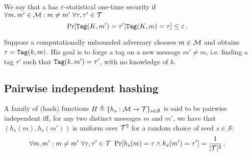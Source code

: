 \begin{definition}
	We say that a \Mac{} has $\varepsilon$-statistical one-time security if $\forall m, m' \in \mathcal{M} : m \neq m' \ \forall \tau, \tau' \in \mathcal{T}$
	\begin{equation}
		\Pr[\texttt{Tag}(K,m') = \tau' | \texttt{Tag}(K,m) = \tau] \leq \varepsilon \, .
	\end{equation}
\end{definition}

Suppose a computationally unbounded adversary chooses $m \in \mathcal{M}$ and obtains $\tau = \texttt{Tag}(k, m)$.
His goal is to forge a tag on a new message $m' \neq m$, i.e. finding a tag $\tau'$ such that $\texttt{Tag}(k,m') = \tau'$, with no knowledge of $k$.


\subsection{Pairwise independent hashing}
\begin{definition}
    A family of (hash) functions $H \triangleq \{h_s:\mathcal{M} \to \mathcal{T}\}_{s \in \mathcal{S}}$ is said to be pairwise independent iff, for any two distinct messages $m$ and $m'$, we have that $(h_s(m), h_s(m'))$ is uniform over $\mathcal{T}^2$ for a random choice of seed $s \in \mathcal{S}$:
    \[
        \forall m, m' : m \neq m' \ \forall \tau, \tau' \in \mathcal{T} \ \Pr[h_s(m) = \tau \wedge h_s(m') = \tau'] = \frac{1}{|\mathcal{T}|^2} \, .
    \]
\end{definition}


